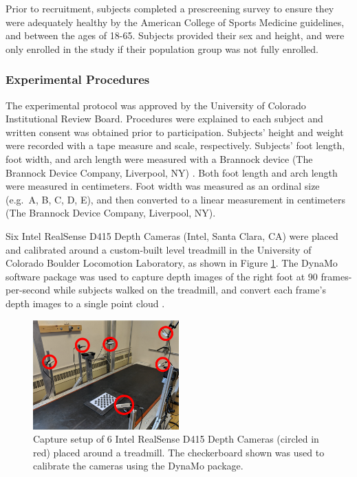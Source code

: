 \documentclass[defaultstyle,11pt]{comps}
\begin{document}
Prior to recruitment, subjects completed a prescreening survey to ensure they were adequately healthy by the American College of Sports Medicine guidelines\citep{Riebe2015}, and between the ages of 18-65.
Subjects provided their sex and height, and were only enrolled in the study if their population group was not fully enrolled.

\hypertarget{experimental-procedures}{%
\subsubsection{Experimental Procedures}\label{experimental-procedures}}

The experimental protocol was approved by the University of Colorado Institutional Review Board.
Procedures were explained to each subject and written consent was obtained prior to participation.
Subjects' height and weight were recorded with a tape measure and scale, respectively.
Subjects' foot length, foot width, and arch length were measured with a Brannock device (The Brannock Device Company, Liverpool, NY) \citep{ASTM2017}.
Both foot length and arch length were measured in centimeters.
Foot width was measured as an ordinal size (e.g.~A, B, C, D, E), and then converted to a linear measurement in centimeters (The Brannock Device Company, Liverpool, NY).

Six Intel RealSense D415 Depth Cameras (Intel, Santa Clara, CA) were placed and calibrated around a custom-built level treadmill in the University of Colorado Boulder Locomotion Laboratory, as shown in Figure \ref{fig:testSetup}.
The DynaMo software package was used to capture depth images of the right foot at 90 frames-per-second while subjects walked on the treadmill, and convert each frame's depth images to a single point cloud \citep{Boppana2019}.

\begin{figure}
\hypertarget{fig:testSetup}{%
\centering
\includegraphics[width=0.5\textwidth,height=\textheight]{../fig/SA2/capturesetup.png}
\caption{Capture setup of 6 Intel RealSense D415 Depth Cameras (circled in red) placed around a treadmill. The checkerboard shown was used to calibrate the cameras using the DynaMo package.}\label{fig:testSetup}
}
\end{figure}
\end{document}
